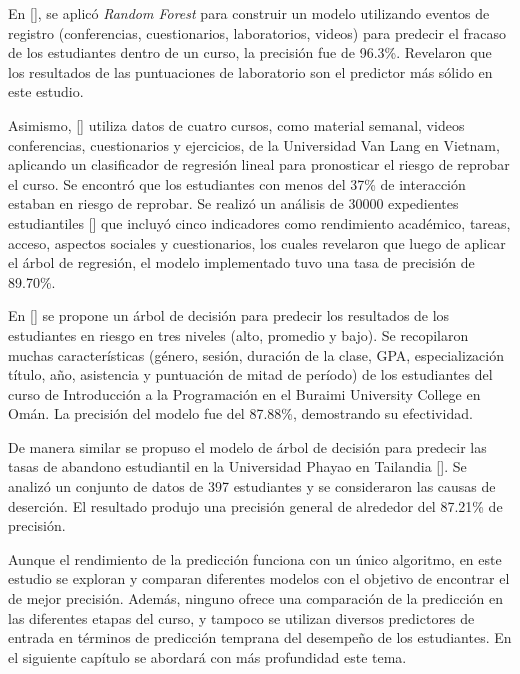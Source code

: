 En [\cite{ljubobratovic2019using}], se aplicó \textit{Random Forest} para construir un modelo utilizando eventos de registro (conferencias, cuestionarios, laboratorios, videos) para predecir el fracaso de los estudiantes dentro de un curso, la precisión fue de 96.3\%. Revelaron que los resultados de las puntuaciones de laboratorio son el predictor más sólido en este estudio.

Asimismo, [\cite{nguyen2021using}] utiliza datos de cuatro cursos, como material semanal, videos conferencias, cuestionarios y ejercicios, de la Universidad Van Lang en Vietnam, aplicando un clasificador de regresión lineal para pronosticar el riesgo de reprobar el curso. Se encontró que los estudiantes con menos del 37\% de interacción estaban en riesgo de reprobar. Se realizó un análisis de 30000 expedientes estudiantiles [\cite{maraza-quispe2021predictive}] que incluyó cinco indicadores como rendimiento académico, tareas, acceso, aspectos sociales y cuestionarios, los cuales revelaron que luego de aplicar el árbol de regresión, el modelo implementado tuvo una tasa de precisión de 89.70\%.  


En [\cite{mi2022research}] se propone un árbol de decisión para predecir los resultados de los estudiantes en riesgo en tres niveles (alto, promedio y bajo). Se recopilaron muchas características (género, sesión, duración de la clase, GPA, especialización título, año, asistencia y puntuación de mitad de período) de los estudiantes del curso de Introducción a la Programación en el Buraimi University College en Omán. La precisión del modelo fue del 87.88\%, demostrando su efectividad.  


De manera similar se propuso el modelo de árbol de decisión para predecir las tasas de abandono estudiantil en la Universidad Phayao en Tailandia [\cite{khan2021machine}]. Se analizó un conjunto de datos de 397 estudiantes y se consideraron las causas de deserción. El resultado produjo una precisión general de alrededor del 87.21\% de precisión.  


Aunque el rendimiento de la predicción funciona con un único algoritmo, en este estudio se exploran y comparan diferentes modelos con el objetivo de encontrar el de mejor precisión. Además, ninguno ofrece una comparación de la predicción en las diferentes etapas del curso, y tampoco se utilizan diversos predictores de entrada en términos de predicción temprana del desempeño de los estudiantes. En el siguiente capítulo se abordará con más profundidad este tema.



